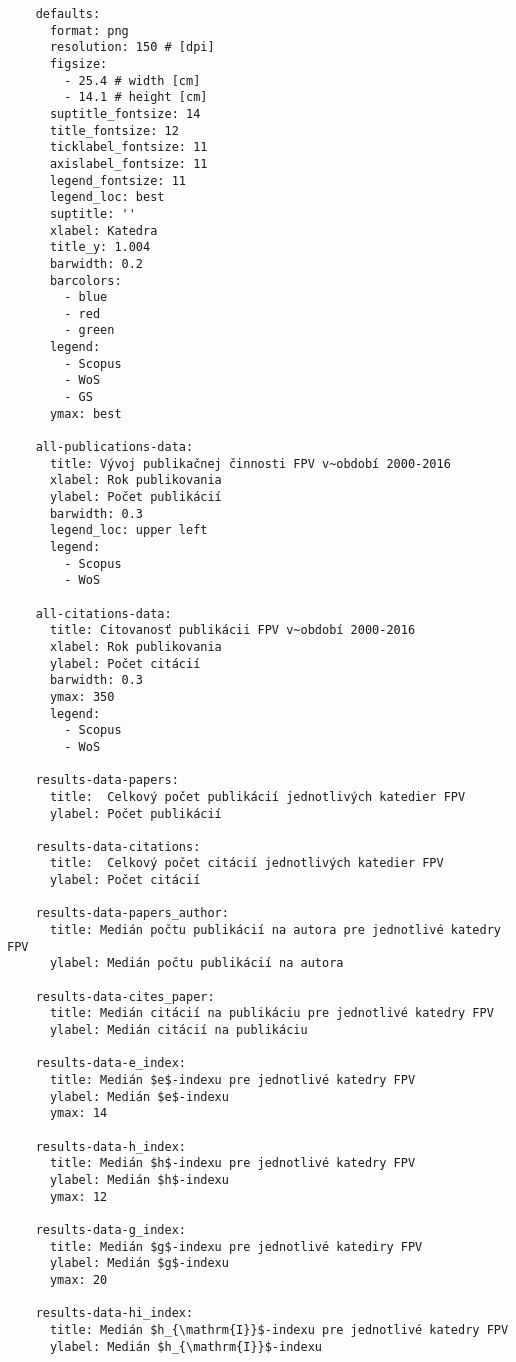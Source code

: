 \begin{source}
  \begin{verbatim}
    defaults:
      format: png
      resolution: 150 # [dpi]
      figsize:
        - 25.4 # width [cm]
        - 14.1 # height [cm]
      suptitle_fontsize: 14
      title_fontsize: 12
      ticklabel_fontsize: 11
      axislabel_fontsize: 11
      legend_fontsize: 11
      legend_loc: best
      suptitle: ''
      xlabel: Katedra
      title_y: 1.004
      barwidth: 0.2
      barcolors:
        - blue
        - red
        - green
      legend:
        - Scopus
        - WoS
        - GS
      ymax: best

    all-publications-data:
      title: Vývoj publikačnej činnosti FPV v~období 2000-2016
      xlabel: Rok publikovania
      ylabel: Počet publikácií
      barwidth: 0.3
      legend_loc: upper left
      legend:
        - Scopus
        - WoS

    all-citations-data:
      title: Citovanosť publikácii FPV v~období 2000-2016
      xlabel: Rok publikovania
      ylabel: Počet citácií
      barwidth: 0.3
      ymax: 350
      legend:
        - Scopus
        - WoS

    results-data-papers:
      title:  Celkový počet publikácií jednotlivých katedier FPV
      ylabel: Počet publikácií

    results-data-citations:
      title:  Celkový počet citácií jednotlivých katedier FPV
      ylabel: Počet citácií

    results-data-papers_author:
      title: Medián počtu publikácií na autora pre jednotlivé katedry FPV
      ylabel: Medián počtu publikácií na autora

    results-data-cites_paper:
      title: Medián citácií na publikáciu pre jednotlivé katedry FPV
      ylabel: Medián citácií na publikáciu

    results-data-e_index:
      title: Medián $e$-indexu pre jednotlivé katedry FPV
      ylabel: Medián $e$-indexu
      ymax: 14

    results-data-h_index:
      title: Medián $h$-indexu pre jednotlivé katedry FPV
      ylabel: Medián $h$-indexu
      ymax: 12

    results-data-g_index:
      title: Medián $g$-indexu pre jednotlivé katediry FPV
      ylabel: Medián $g$-indexu
      ymax: 20

    results-data-hi_index:
      title: Medián $h_{\mathrm{I}}$-indexu pre jednotlivé katedry FPV
      ylabel: Medián $h_{\mathrm{I}}$-indexu


\end{verbatim}
\end{source}
